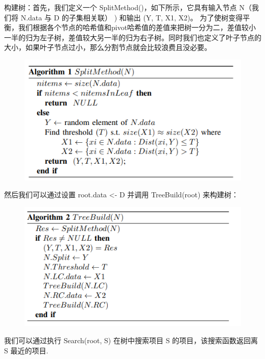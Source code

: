 \documentclass{cjc}
\begin{document}
构建树：首先，我们定义一个 SplitMethod()，如下所示，它具有输入节点 N（我们将 N.data 与 D 的子集相关联） ) 和输出 (Y, T, X1, X2)。 为了使树变得平衡，我们根据各个节点的哈希值和pivot哈希值的差值来把树一分为二，差值较小一半的归为左子树，差值较大另一半的归为右子树。同时我们也定义了叶子节点的大小，如果叶子节点过小，那么分割节点就会比较浪费且没必要。

\begin{figure}[htb]
  \centering
  \includegraphics[width=\linewidth]{pics/image-20220622212533508.png}
\end{figure}


然后我们可以通过设置 root.data <- D 并调用 TreeBuild(root) 来构建树：

\begin{figure}[htb]
  \centering
  \includegraphics[width=\linewidth]{pics/image-20220622212936887.png}
\end{figure}


我们可以通过执行 Search(root, S) 在树中搜索项目 S 的项目，该搜索函数返回离 S 最近的项目.
\end{document}
